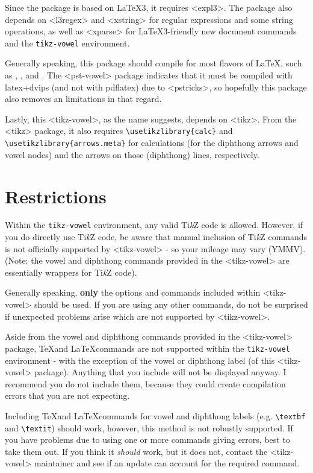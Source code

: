 \documentclass{article}
\newcommand{\pkg}[1]{\texttt{#1}}
\newcommand{\pdfLaTeX}{\hologo{pdfLaTeX}\xspace}
\newcommand{\TikZ}{Ti\textit{k}Z\xspace}
\def\texttt#1{<#1>}%
\begin{document}
Since the package is based on \LaTeX3, it requires \pkg{expl3}.  The package also depends on \pkg{l3regex} and \pkg{xstring} for regular expressions and some string operations, as well as \pkg{xparse} for \LaTeX3-friendly new document commands and the \verb|tikz-vowel| environment.

Generally speaking, this package should compile for most flavors of \LaTeX, such as \pdfLaTeX, \LuaLaTeX, and \XeLaTeX.  The \pkg{pst-vowel} package indicates that it must be compiled with latex+dvips (and not with pdflatex) due to \pkg{pstricks}, so hopefully this package also removes an limitations in that regard.

Lastly, this \pkg{tikz-vowel}, as the name suggests, depends on \pkg{tikz}.  From the \pkg{tikz} package, it also requires \verb|\usetikzlibrary{calc}| and \verb|\usetikzlibrary{arrows.meta}| for calculations (for the diphthong arrows and vowel nodes) and the arrows on those (diphthong) lines, respectively.


\section{Restrictions}
\label{sec:Restrictions}

Within the \verb|tikz-vowel| environment, any valid \TikZ code is allowed.  However, if you do directly use \TikZ code, be aware that manual inclusion of \TikZ commands is not officially supported by \pkg{tikz-vowel} - so your mileage may vary (YMMV).  (Note: the vowel and diphthong commands provided in the \pkg{tikz-vowel} are essentially wrappers for \TikZ code).

Generally speaking, \textbf{only} the options and commands included within \pkg{tikz-vowel} should be used.  If you are using any other commands, do not be surprised if unexpected problems arise which are not supported by \pkg{tikz-vowel}.

Aside from the vowel and diphthong commands provided in the \pkg{tikz-vowel} package, \TeX and \LaTeX commands are not supported within the \verb|tikz-vowel| environment - with the exception of the vowel or diphthong label (of this \pkg{tikz-vowel} package).  Anything that you include will not be displayed anyway.  I recommend you do not include them, because they could create compilation errors that you are not expecting.

Including \TeX and \LaTeX commands for vowel and diphthong labels (e.g. \verb|\textbf| and \verb|\textit|) should work, however, this method is not robustly supported.  If you have problems due to using one or more commands giving errors, best to take them out.  If you think it \textit{should} work, but it does not, contact the \pkg{tikz-vowel} maintainer and see if an update can account for the required command.
\end{document}
